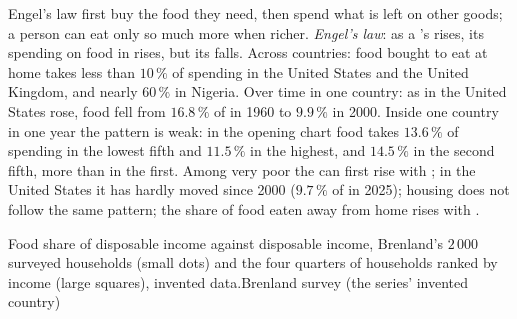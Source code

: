 \begin{model}{Engel's law}\label{def:g7:households:engels-law}
\assumes {} first buy the food they need, then spend what is left on other goods; a
person can eat only so much more when richer.
\predicts \emph{Engel's law}: as a 's  rises, its spending on
food in  rises, but its  falls.
\tested Across countries: food bought to eat at home takes less than $10\,\%$ of 
spending in the United States and the United Kingdom, and nearly $60\,\%$ in Nigeria. Over time
in one country: as  in the United States rose, food fell from $16.8\,\%$ of  in 1960 to $9.9\,\%$ in 2000. Inside one country in one year the pattern is weak: in the
opening chart food takes $13.6\,\%$ of spending in the lowest fifth and $11.5\,\%$ in the highest,
and $14.5\,\%$ in the second fifth, more than in the first.
\breaks Among very poor  the  can first rise with ; in the United
States it has hardly moved since 2000 ($9.7\,\%$ of  in 2025); housing does not
follow the same pattern; the share of food eaten away from home rises with .
\end{model}

\begin{omchart}{Food share of disposable income against disposable income, Brenland's
$2\,000$ surveyed households (small dots) and the four quarters of households ranked by income
(large squares), invented data.}{Brenland  survey (the series' invented country)}
\end{omchart}

